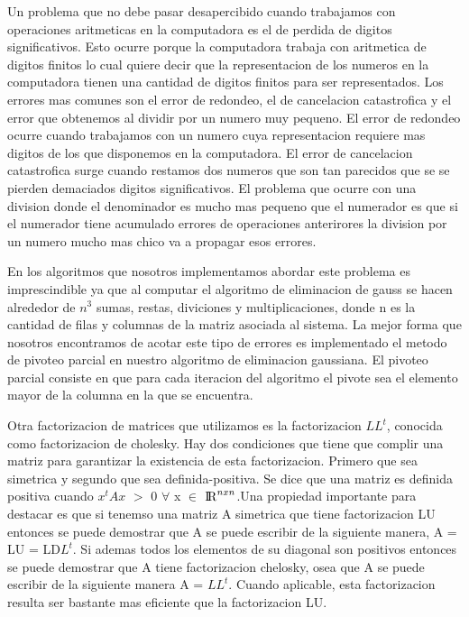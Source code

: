 \indent Un problema que no debe pasar desapercibido cuando trabajamos con operaciones aritmeticas en la computadora es el de perdida de digitos significativos. Esto ocurre porque la computadora trabaja con aritmetica de digitos finitos lo cual quiere decir que la representacion de los numeros en la computadora tienen una cantidad de digitos finitos para ser representados. Los errores mas comunes son el error de redondeo, el de cancelacion catastrofica y el error que obtenemos al dividir por un numero muy pequeno. El error de redondeo ocurre cuando trabajamos con un numero cuya representacion requiere mas digitos de los que disponemos en la computadora. El error de cancelacion catastrofica surge cuando restamos dos numeros que son tan parecidos que se se pierden demaciados digitos significativos. El problema que ocurre con una division donde el denominador es mucho mas pequeno que el numerador es que si el numerador tiene acumulado errores de operaciones anterirores la division por un numero mucho mas chico va a propagar esos errores.\par
\indent En los algoritmos que nosotros implementamos abordar este problema es imprescindible ya que al computar el algoritmo de eliminacion de gauss se hacen alrededor de $n^{3}$ sumas, restas, diviciones y multiplicaciones, donde n es la cantidad de filas y columnas de la matriz asociada al sistema. La mejor forma que nosotros encontramos de acotar este tipo de errores es implementado el metodo de pivoteo parcial en nuestro algoritmo de eliminacion gaussiana. El pivoteo parcial consiste en que para cada iteracion del algoritmo el pivote sea el elemento mayor de la columna en la que se encuentra.\par
\indent Otra factorizacion de matrices que utilizamos es la factorizacion $LL^{t}$, conocida como factorizacion de cholesky. Hay dos condiciones que tiene que complir una matriz para garantizar la existencia de esta factorizacion. Primero que sea simetrica y segundo que sea definida-positiva. Se dice que una matriz es definida positiva cuando $x^{t}Ax$ $>$ 0 $\forall$ x $\in$ ${\rm I\!R}^{nxn}$.Una propiedad importante para destacar es que si tenemso una matriz A simetrica que tiene factorizacion LU entonces se puede demostrar que A se puede escribir de la siguiente manera, A = LU = LD$L^{t}$. Si ademas todos los elementos de su diagonal son positivos entonces se puede demostrar que A tiene factorizacion chelosky, osea que A se puede escribir de la siguiente manera A = $LL^{t}$. Cuando aplicable, esta factorizacion resulta ser bastante mas eficiente que la factorizacion LU.\par
